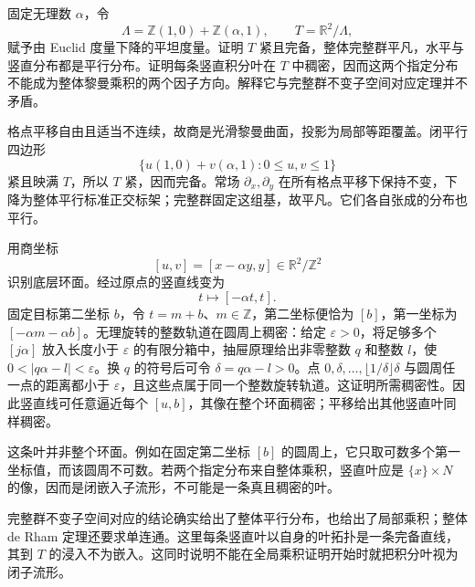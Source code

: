\begin{exercise}\label{g3:ex:irrational-flat-torus-parallel-leaf}
	固定无理数 \(\alpha\)，令
	\[
		\Lambda=\mathbb Z(1,0)+\mathbb Z(\alpha,1),
		\qquad T=\mathbb R^2/\Lambda,
	\]
	赋予由 Euclid 度量下降的平坦度量。证明 \(T\) 紧且完备，整体完整群平凡，水平与竖直分布都是平行分布。证明每条竖直积分叶在 \(T\) 中稠密，因而这两个指定分布不能成为整体黎曼乘积的两个因子方向。解释它与完整群不变子空间对应定理并不矛盾。
\end{exercise}
\begin{solution}
	格点平移自由且适当不连续，故商是光滑黎曼曲面，投影为局部等距覆盖。闭平行四边形
	\[
		\{u(1,0)+v(\alpha,1):0\le u,v\le1\}
	\]
	紧且映满 \(T\)，所以 \(T\) 紧，因而完备。常场 \(\partial_x,\partial_y\) 在所有格点平移下保持不变，下降为整体平行标准正交标架；完整群固定这组基，故平凡。它们各自张成的分布也平行。

	用商坐标
	\[
		[u,v]=[x-\alpha y,y]\in\mathbb R^2/\mathbb Z^2
	\]
	识别底层环面。经过原点的竖直线变为
	\[
		t\longmapsto[-\alpha t,t].
	\]
	固定目标第二坐标 \(b\)，令 \(t=m+b\)、\(m\in\mathbb Z\)，第二坐标便恰为 \([b]\)，第一坐标为 \([-\alpha m-\alpha b]\)。无理旋转的整数轨道在圆周上稠密：给定 \(\varepsilon>0\)，将足够多个 \([j\alpha]\) 放入长度小于 \(\varepsilon\) 的有限分箱中，抽屉原理给出非零整数 \(q\) 和整数 \(l\)，使 \(0<|q\alpha-l|<\varepsilon\)。换 \(q\) 的符号后可令 \(\delta=q\alpha-l>0\)。点 \(0,\delta,\ldots,\lfloor1/\delta\rfloor\delta\) 与圆周任一点的距离都小于 \(\varepsilon\)，且这些点属于同一个整数旋转轨道。这证明所需稠密性。因此竖直线可任意逼近每个 \([u,b]\)，其像在整个环面稠密；平移给出其他竖直叶同样稠密。

	这条叶并非整个环面。例如在固定第二坐标 \([b]\) 的圆周上，它只取可数多个第一坐标值，而该圆周不可数。若两个指定分布来自整体乘积，竖直叶应是 \(\{x\}\times N\) 的像，因而是闭嵌入子流形，不可能是一条真且稠密的叶。

	完整群不变子空间对应的结论确实给出了整体平行分布，也给出了局部乘积；整体 de Rham 定理还要求单连通。这里每条竖直叶以自身的叶拓扑是一条完备直线，其到 \(T\) 的浸入不为嵌入。这同时说明不能在全局乘积证明开始时就把积分叶视为闭子流形。
\end{solution}

